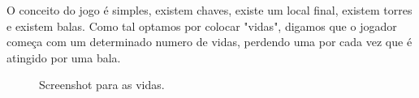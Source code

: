 O conceito do jogo é simples, existem chaves, existe um local final, existem torres e existem balas. Como tal optamos por colocar "vidas", digamos que o jogador começa com um determinado numero de vidas, perdendo uma por cada vez que é atingido por uma bala.

\begin{figure}[here]
                 \caption{Screenshot para as vidas.}
                 \label{fig:prototype}
\end{figure}